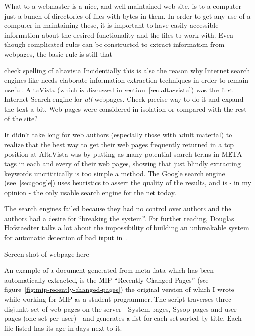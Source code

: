 What to a webmaster is a nice, and well maintained web-site, is to a
computer just a bunch of directories of files with bytes in them.  In
order to get any use of a computer in maintaining these, it is
important to have easily accessible information about the desired
functionality and the files to work with.  Even though complicated
rules can be constructed to extract information from webpages, the
basic rule is still that

\begin{center}
\end{center}



\textsf{check spelling of altavista}
Incidentially this is also the reason why Internet search engines like
needs elaborate information extraction techniques in order
to remain useful.  AltaVista (which is discussed in
section~\vref{sec:alta-vista}) was the first Internet Search engine
for \textit{all} webpages. \textsf{Check precise way to do it and
  expand the text a bit.  Web pages were considered in isolation or
  compared with the rest of the site?}

It didn't take long for web authors (especially those with adult
material) to realize that the best way to get their web pages
frequently returned in a top position at AltaVista was by putting as
many potential search terms in META-tags in each and every of their
web pages, showing that just blindly extracting keywords
\textsf{uncrititically} is too simple a method.  The Google search
engine (see~\vref{sec:google}) uses \textsf{heuristics} to assert the
quality of the results, and is - in my opinion - the only usable
search engine for the net today.

The search engines failed because they had no control over authors and
the authors had a desire for ``breaking the system''.  For further
reading, Douglas Hofstaedter talks a lot about the impossibility of
building an unbreakable system for automatic detection of bad input
in~\cite{goedelescherbach}.


\textsf{Screen shot of webpage here}

An example of a document generated from meta-data which has been
automatically extracted, is the MIP ``Recently Changed Pages'' (see
figure~\vref{fig:mip-recently-changed-pages}) the original version of
which I wrote while working for MIP as a student programmer.  The
script traverses three disjunkt set of web pages on the server -
System pages, Sysop pages and user pages (one set per user) - and
generates a list for each set sorted by title.  Each file listed has
its age in days next to it.

